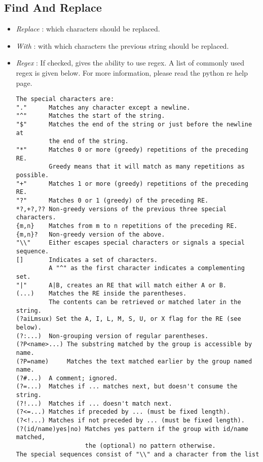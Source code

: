 \documentclass[12pt, a4paper]{scrartcl}
\begin{document}
\subsection{Find And Replace}
\begin{itemize}
    \item \emph{Replace} : which characters should be replaced.
    \item \emph{With} : with which characters the previous string should be replaced.
    \item \emph{Regex} : If checked, gives the ability to use regex. A list of commonly used regex is given below. For more information, please read the python re help page.
\begingroup
    \fontsize{10pt}{12pt}\selectfont
        \begin{verbatim}
The special characters are:
"."      Matches any character except a newline.
"^"      Matches the start of the string.
"$"      Matches the end of the string or just before the newline at
         the end of the string.
"*"      Matches 0 or more (greedy) repetitions of the preceding RE.
         Greedy means that it will match as many repetitions as possible.
"+"      Matches 1 or more (greedy) repetitions of the preceding RE.
"?"      Matches 0 or 1 (greedy) of the preceding RE.
*?,+?,?? Non-greedy versions of the previous three special characters.
{m,n}    Matches from m to n repetitions of the preceding RE.
{m,n}?   Non-greedy version of the above.
"\\"     Either escapes special characters or signals a special sequence.
[]       Indicates a set of characters.
         A "^" as the first character indicates a complementing set.
"|"      A|B, creates an RE that will match either A or B.
(...)    Matches the RE inside the parentheses.
         The contents can be retrieved or matched later in the string.
(?aiLmsux) Set the A, I, L, M, S, U, or X flag for the RE (see below).
(?:...)  Non-grouping version of regular parentheses.
(?P<name>...) The substring matched by the group is accessible by name.
(?P=name)     Matches the text matched earlier by the group named name.
(?#...)  A comment; ignored.
(?=...)  Matches if ... matches next, but doesn't consume the string.
(?!...)  Matches if ... doesn't match next.
(?<=...) Matches if preceded by ... (must be fixed length).
(?<!...) Matches if not preceded by ... (must be fixed length).
(?(id/name)yes|no) Matches yes pattern if the group with id/name matched,
                   the (optional) no pattern otherwise.
The special sequences consist of "\\" and a character from the list

\end{verbatim}
\end{itemize}
\end{document}
